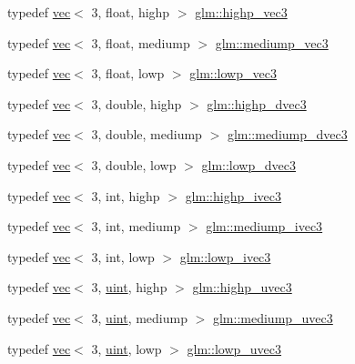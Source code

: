 \begin{DoxyCompactItemize}
\item 
typedef \hyperlink{structglm_1_1vec}{vec}$<$ 3, float, highp $>$ \hyperlink{group__core__precision_ga37ff190d92f9be26223a5de4153b9133}{glm\+::highp\+\_\+vec3}
\item 
typedef \hyperlink{structglm_1_1vec}{vec}$<$ 3, float, mediump $>$ \hyperlink{group__core__precision_ga709e6ab33a5deb4a42ce9fcde75655f3}{glm\+::mediump\+\_\+vec3}
\item 
typedef \hyperlink{structglm_1_1vec}{vec}$<$ 3, float, lowp $>$ \hyperlink{group__core__precision_ga185f659de082bad5abfa576891d0612d}{glm\+::lowp\+\_\+vec3}
\item 
typedef \hyperlink{structglm_1_1vec}{vec}$<$ 3, double, highp $>$ \hyperlink{group__core__precision_ga63f89fa26f599ac15428c9d1a70a5467}{glm\+::highp\+\_\+dvec3}
\item 
typedef \hyperlink{structglm_1_1vec}{vec}$<$ 3, double, mediump $>$ \hyperlink{group__core__precision_ga11d5fecb18f3d7e5f7add0663a8d7d3f}{glm\+::mediump\+\_\+dvec3}
\item 
typedef \hyperlink{structglm_1_1vec}{vec}$<$ 3, double, lowp $>$ \hyperlink{group__core__precision_gaf59ddbed824c80439be0a04a1a46d520}{glm\+::lowp\+\_\+dvec3}
\item 
typedef \hyperlink{structglm_1_1vec}{vec}$<$ 3, int, highp $>$ \hyperlink{group__core__precision_ga52ba3edf3183078cf4129e6193b32a2c}{glm\+::highp\+\_\+ivec3}
\item 
typedef \hyperlink{structglm_1_1vec}{vec}$<$ 3, int, mediump $>$ \hyperlink{group__core__precision_ga33f150e1d55aa6c91927cb0431bf0708}{glm\+::mediump\+\_\+ivec3}
\item 
typedef \hyperlink{structglm_1_1vec}{vec}$<$ 3, int, lowp $>$ \hyperlink{group__core__precision_ga77f1494e08fca27e26aebbbfb8162298}{glm\+::lowp\+\_\+ivec3}
\item 
typedef \hyperlink{structglm_1_1vec}{vec}$<$ 3, \hyperlink{group__core__precision_ga4fd29415871152bfb5abd588334147c8}{uint}, highp $>$ \hyperlink{group__core__precision_ga2e16953ad75ce0c6d7faa921ca006ce5}{glm\+::highp\+\_\+uvec3}
\item 
typedef \hyperlink{structglm_1_1vec}{vec}$<$ 3, \hyperlink{group__core__precision_ga4fd29415871152bfb5abd588334147c8}{uint}, mediump $>$ \hyperlink{group__core__precision_ga0eaf34ab9ebc5e2c92cd6d6d5aa272f4}{glm\+::mediump\+\_\+uvec3}
\item 
typedef \hyperlink{structglm_1_1vec}{vec}$<$ 3, \hyperlink{group__core__precision_ga4fd29415871152bfb5abd588334147c8}{uint}, lowp $>$ \hyperlink{group__core__precision_gab06a83e99d38e15a3e54d38208b9deba}{glm\+::lowp\+\_\+uvec3}

\end{DoxyCompactItemize}
